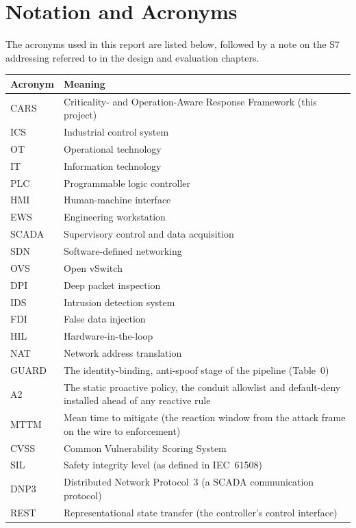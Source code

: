 \chapter*{Notation and Acronyms}
\noindent
The acronyms used in this report are listed below, followed by a note on the S7 addressing referred to in the design and evaluation chapters.

\vspace{0.5em}
\begin{center}
\small
\begin{tabular}{ll}
\hline
Acronym & Meaning \\
\hline
CARS & Criticality- and Operation-Aware Response Framework (this project) \\
ICS & Industrial control system \\
OT & Operational technology \\
IT & Information technology \\
PLC & Programmable logic controller \\
HMI & Human-machine interface \\
EWS & Engineering workstation \\
SCADA & Supervisory control and data acquisition \\
SDN & Software-defined networking \\
OVS & Open vSwitch \\
DPI & Deep packet inspection \\
IDS & Intrusion detection system \\
FDI & False data injection \\
HIL & Hardware-in-the-loop \\
NAT & Network address translation \\
GUARD & The identity-binding, anti-spoof stage of the pipeline (Table~0) \\
A2 & The static proactive policy, the conduit allowlist and default-deny installed ahead of any reactive rule \\
MTTM & Mean time to mitigate (the reaction window from the attack frame on the wire to enforcement) \\
CVSS & Common Vulnerability Scoring System \\
SIL & Safety integrity level (as defined in IEC~61508) \\
DNP3 & Distributed Network Protocol~3 (a SCADA communication protocol) \\
REST & Representational state transfer (the controller's control interface) \\

\end{tabular}
\end{center}
